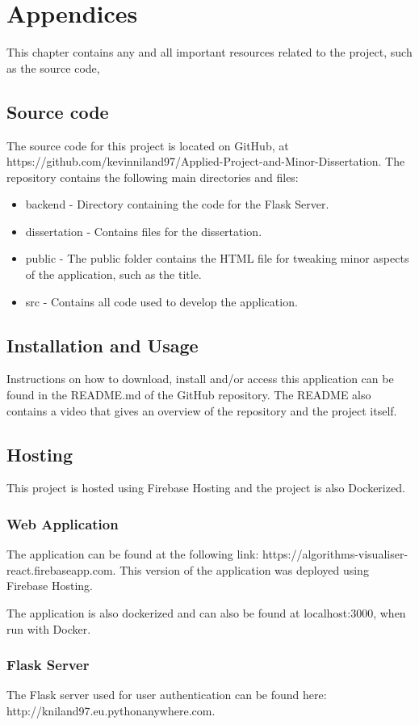 \chapter{Appendices}
This chapter contains any and all important resources related to the project, such as the source code, 

\section{Source code}
The source code for this project is located on GitHub, at https://github.com/kevinniland97/Applied-Project-and-Minor-Dissertation. The repository contains the following main directories and files:

\begin{itemize}
    \item backend - Directory containing the code for the Flask Server.
    \item dissertation - Contains files for the dissertation.
    \item public - The public folder contains the HTML file for tweaking minor aspects of the application, such as the title.
    \item src - Contains all code used to develop the application.
\end{itemize}

\section{Installation and Usage}
Instructions on how to download, install and/or access this application can be found in the README.md of the GitHub repository. The README also contains a video that gives an overview of the repository and the project itself.

\newpage
\section{Hosting}
This project is hosted using Firebase Hosting and the project is also Dockerized.

\subsection{Web Application}
The application can be found at the following link: https://algorithms-visualiser-react.firebaseapp.com. This version of the application was deployed using Firebase Hosting.

\medskip
The application is also dockerized and can also be found at localhost:3000, when run with Docker.

\subsection{Flask Server}
The Flask server used for user authentication can be found here: http://kniland97.eu.pythonanywhere.com.